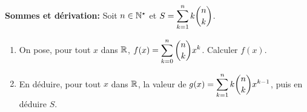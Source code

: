 \documentclass[a4paper, 11pt,reqno]{article}
\begin{document}
\begin{exercice}  \;  \textbf{Sommes et d\'erivation:} 
Soit $n\in\mathbb{N}^{\star}$ et $S=\displaystyle \sum\limits_{k=1}^n k\displaystyle \binom{n}{k}$. %
\begin{enumerate}
\item
On pose, pour tout $x$ dans $\mathbb{R}$, $f(x)=\displaystyle \sum\limits_{k=0}^n \displaystyle \binom{n}{k}x^k$. Calculer $f(x)$.
\item 
En d\'eduire, pour tout $x$ dans $\mathbb{R}$, la valeur de $g(x)=\displaystyle \sum\limits_{k=1}^n k\displaystyle \binom{n}{k}x^{k-1}$, puis en d\'eduire $S$.
\end{enumerate}
\end{exercice}


\end{document}
